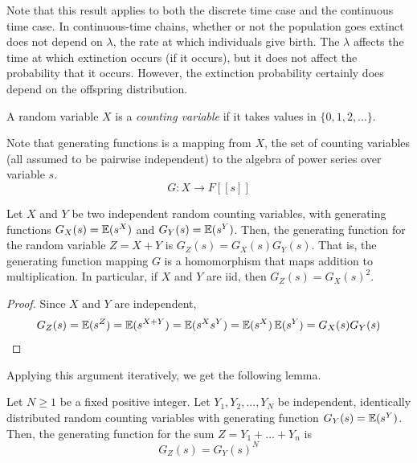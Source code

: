 	Note that this result applies to both the discrete time case and the continuous time case. In continuous-time chains, whether or not the population goes extinct does not depend on $\lambda$, the rate at which individuals give birth. The $\lambda$ affects the time at which extinction occurs (if it occurs), but it does not affect the probability that it occurs. However, the extinction probability certainly does depend on the offspring distribution. 

	\begin{definition}
		\label{def:counting-variable}
		A random variable $X$ is a \textit{counting variable} if it takes values in $\{0, 1, 2, ...\}$. 
	\end{definition}

	Note that generating functions is a mapping from $X$, the set of counting variables (all assumed to be pairwise independent) to the algebra of power series over variable $s$.
	\begin{equation}
		G: X \to F[[s]]
	\end{equation}

	\begin{lemma}
		\label{thm:generating-function-of-a-sum}
		Let $X$ and $Y$ be two independent random counting variables, with generating functions $G_X (s) = \operatorname{\mathbb{E}}(s^X)$ and $G_Y (s) = \operatorname{\mathbb{E}}(s^Y)$. Then, the generating function for the random variable $Z = X + Y$ is $G_Z(s) = G_X (s) G_Y (s)$. That is, the generating function mapping $G$ is a homomorphism that maps addition to multiplication. In particular, if $X$ and $Y$ are iid, then $G_Z (s) = G_X (s)^2$. 
	\end{lemma}
	\begin{proof}
		Since $X$ and $Y$ are independent, 
		\begin{equation}
			G_Z (s) = \operatorname{\mathbb{E}}(s^Z) = \operatorname{\mathbb{E}}(s^{X+Y}) = \operatorname{\mathbb{E}}(s^X s^Y) = \operatorname{\mathbb{E}}(s^X) \operatorname{\mathbb{E}}(s^Y) = G_X (s) G_Y (s)
		\end{equation}
	\end{proof}

	Applying this argument iteratively, we get the following lemma. 
	\begin{lemma}
		\label{thm:generating-function-of-a-fixed-length-random-sum}
		Let $N \geq 1$ be a fixed positive integer. Let $Y_1, Y_2, ..., Y_N$ be independent, identically distributed random counting variables with generating function $G_Y (s) = \operatorname{\mathbb{E}}(s^Y)$. Then, the generating function for the sum $Z = Y_1 + ... + Y_n$ is 
		\begin{equation}
			G_Z (s) = G_Y (s)^N
		\end{equation}
	\end{lemma}

